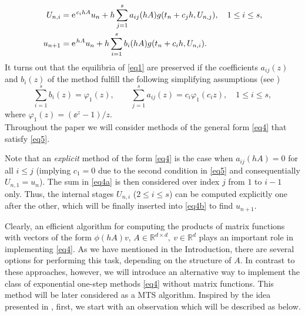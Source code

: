 \begin{subequations} \label{eq4}
\begin{align}
 U_{n,i}&= \ee^{c_i h A}u_n +h \sum_{j=1}^{s}a_{ij}(h A) g(t_n +c_j h, U_{n,j}), \q  1\leq i\leq s,  \label{eq4a} \\
u_{n+1} &= \ee^{h A}u_n +  h \sum_{i=1}^{s}b_{i}(h A)g(t_n +c_i h, U_{n,i}).  \label{eq4b} 
\end{align} 
\end{subequations}
It turns out that the equilibria of \eqref{eq1} are preserved if the coefficients $a_{ij}(z)$ and
$b_i(z)$ of the method fulfill the following simplifying assumptions (see \cite{HO05b})
\begin{equation}  \label{eq5}
\sum_{i=1}^{s}b_{i}(z)= \varphi _{1} (z), \quad \quad
\sum_{j=1}^{s}a_{ij}(z)=c_i \varphi _{1} (c_i z), \quad 1\leq i\leq s,
\end{equation}
where $\varphi_{1}(z)=(\ee^z -1)/z$.\\
Throughout the paper we will consider methods of the general form \eqref{eq4} that satisfy \eqref{eq5}.

Note that an {\em explicit} method of the form \eqref{eq4} is the case when $a_{ij}(h A)=0$ for all $i\leq j$ (implying $c_1=0$ due to the second condition in \eqref{eq5} and consequentially $U_{n,1}=u_n$). The sum in \eqref{eq4a} is then considered over index $j$ from $1$ to $i-1$ only. Thus, the internal stages $U_{n,i}$ ($2\leq i\leq s$) can be computed explicitly one after the other, which will be finally inserted into \eqref{eq4b} to find $u_{n+1}$.

Clearly, an efficient algorithm for computing the products of matrix functions with vectors of the form $\phi (hA)v$,  $A\in \mathbb{R}^{d\times d}, \ v\in \mathbb{R}^{d}$
plays an important role in implementing \eqref{eq4}. As we have mentioned in the Introduction, there are several options for performing this task, depending on the structure of $A$. In contrast to these approaches, however,  
we will introduce an alternative way to implement the class of exponential one-step methods \eqref{eq4} without matrix functions. 
This method will be later considered as a MTS algorithm.
Inspired by the idea presented in \cite[Sect. 5.3]{HO11}, first, we start with an observation which will be described as below. 
